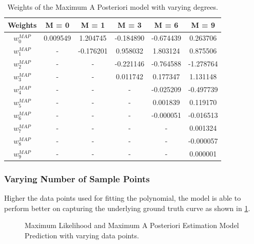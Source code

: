 \documentclass[12pt,twoside,a4paper]{article}
\begin{document}
\begin{table}[H]
\centering
\begin{tabular}{|c|c|c|c|c|c|}
\hline
\textbf{Weights}              & \textbf{M = 0} & \textbf{M = 1} & \textbf{M = 3} & \textbf{M = 6} & \textbf{M = 9} \\ \hline
\textit{\textbf{$w_0^{MAP}$}} & 0.009549       & 1.204745       & -0.184890      & -0.674439      & 0.263706       \\ \hline
\textit{\textbf{$w_1^{MAP}$}} & -              & -0.176201      & 0.958032       & 1.803124       & 0.875506       \\ \hline
\textit{\textbf{$w_2^{MAP}$}} & - & - & -0.221146 & -0.764588 & -1.278764 \\ \hline
\textit{\textbf{$w_3^{MAP}$}} & - & - & 0.011742  & 0.177347  & 1.131148  \\ \hline
\textit{\textbf{$w_4^{MAP}$}} & - & - & -         & -0.025209 & -0.497739 \\ \hline
\textit{\textbf{$w_5^{MAP}$}} & - & - & -         & 0.001839  & 0.119170  \\ \hline
\textit{\textbf{$w_6^{MAP}$}} & - & - & -         & -0.000051 & -0.016513 \\ \hline
\textit{\textbf{$w_7^{MAP}$}} & - & - & -         & -         & 0.001324  \\ \hline
\textit{\textbf{$w_8^{MAP}$}} & - & - & -         & -         & -0.000057 \\ \hline
\textit{\textbf{$w_9^{MAP}$}} & - & - & -         & -         & 0.000001  \\ \hline
\end{tabular}
\caption{Weights of the Maximum A Posteriori model with varying degrees.}
\label{MAPWEIGHTS}
\end{table}


\subsubsection{Varying Number of Sample Points}
Higher the data points used for fitting the polynomial, the model is able to perform better on capturing the underlying ground truth curve as shown in \ref{DATAP}.

\begin{figure}[H]
    \centering
    \hspace{0mm}
    \hspace{0mm}
    \caption{Maximum Likelihood and Maximum A Posteriori Estimation Model Prediction with varying data points.}
    \label{DATAP}
\end{figure}
\end{document}
